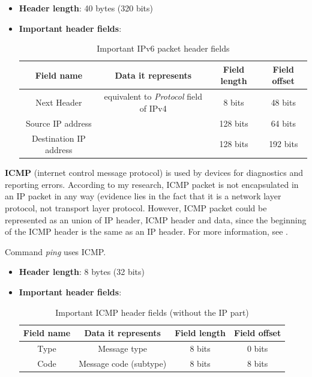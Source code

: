 \documentclass[a4paper]{article}
\begin{document}
  \begin{itemize}
    \item \textbf{Header length}: 40 bytes (320 bits)
    \item \textbf{Important header fields}:
      \begin{table}[h]
        \centering
        \begin{tabular}{|c|c|c|c|}
          \hline
          Field name & Data it represents & Field length & Field offset \\
          \hline
          \hline
          Next Header & equivalent to \textit{Protocol} field of IPv4 & 8 bits & 48 bits \\
          \hline
          Source IP address & & 128 bits & 64 bits \\
          \hline
          Destination IP address & & 128 bits & 192 bits \\
          \hline
        \end{tabular}
        \caption{Important IPv6 packet header fields}
      \end{table}
  \end{itemize}

  \vspace{1cm}


  \textbf{ICMP} (internet control message protocol) is used by devices for
  diagnostics and reporting errors. According to my research, ICMP packet is 
  not encapsulated in an IP packet in any way (evidence lies in the fact that 
  it is a network layer protocol, not transport layer protocol. However, ICMP 
  packet could be represented as an union of IP header, ICMP header and data, 
  since the beginning of the ICMP header is the same as an IP header.
  For more information, see \cite{wikipedia:icmp}.

  \begin{notes}
    \item Command \textit{ping} uses ICMP.
  \end{notes}

  \begin{itemize}
    \item \textbf{Header length}: 8 bytes (32 bits)
    \item \textbf{Important header fields}:
      \begin{table}[h]
        \centering
        \begin{tabular}{|c|c|c|c|}
          \hline
          Field name & Data it represents & Field length & Field offset \\
          \hline
          \hline
          Type & Message type & 8 bits & 0 bits \\
          \hline
          Code & Message code (subtype) & 8 bits & 8 bits \\
          \hline
        \end{tabular}
        \caption{Important ICMP header fields (without the IP part)}
      \end{table}
  \end{itemize}
\end{document}
